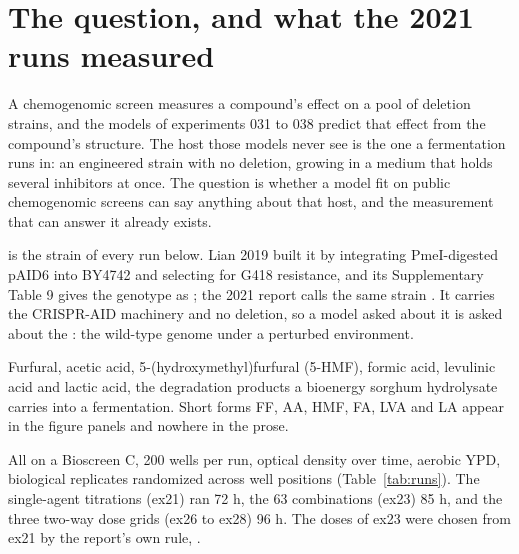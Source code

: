 
\section{The question, and what the 2021 runs measured}
\label{sec:question}

A chemogenomic screen measures a compound's effect on a pool of deletion strains, and
the models of experiments 031 to 038 predict that effect from the compound's structure.
The host those models never see is the one a fermentation runs in: an engineered strain
with no deletion, growing in a medium that holds several inhibitors at once. The
question is whether a model fit on public chemogenomic screens can say anything about
that host, and the measurement that can answer it already exists.

 is the strain of every run below. Lian 2019 built it by integrating
PmeI-digested pAID6 into BY4742 and selecting for G418 resistance, and its
Supplementary Table 9 gives the genotype as
; the 2021
report calls the same strain .
It carries the CRISPR-AID machinery and no deletion, so a model asked about it is asked
about the : the wild-type genome under a perturbed environment.

 Furfural, acetic acid, 5-(hydroxymethyl)furfural (5-HMF),
formic acid, levulinic acid and lactic acid, the degradation products a bioenergy
sorghum hydrolysate carries into a fermentation. Short forms FF, AA, HMF, FA, LVA and
LA appear in the figure panels and nowhere in the prose.

 All on a Bioscreen C, 200 wells per run, optical density over
time, aerobic YPD, biological replicates randomized across well positions
(Table~\ref{tab:runs}). The single-agent titrations (ex21) ran 72 h, the 63 combinations
(ex23) 85 h, and the three two-way dose grids (ex26 to ex28) 96 h. The doses of ex23
were chosen from ex21 by the report's own rule, .

